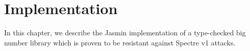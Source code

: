 \chapter{Implementation}\label{chap:impl}

In this chapter, we describe the Jasmin implementation of a type-checked big number library which is 
proven to be resistant against Spectre v1 attacks. 
